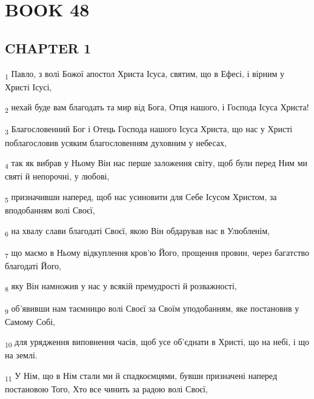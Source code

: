 \section{BOOK 48}
\subsection{CHAPTER 1}
\begin{tcolorbox}
\textsubscript{1} Павло, з волі Божої апостол Христа Ісуса, святим, що в Ефесі, і вірним у Христі Ісусі,
\end{tcolorbox}
\begin{tcolorbox}
\textsubscript{2} нехай буде вам благодать та мир від Бога, Отця нашого, і Господа Ісуса Христа!
\end{tcolorbox}
\begin{tcolorbox}
\textsubscript{3} Благословенний Бог і Отець Господа нашого Ісуса Христа, що нас у Христі поблагословив усяким благословенням духовним у небесах,
\end{tcolorbox}
\begin{tcolorbox}
\textsubscript{4} так як вибрав у Ньому Він нас перше заложення світу, щоб були перед Ним ми святі й непорочні, у любові,
\end{tcolorbox}
\begin{tcolorbox}
\textsubscript{5} призначивши наперед, щоб нас усиновити для Себе Ісусом Христом, за вподобанням волі Своєї,
\end{tcolorbox}
\begin{tcolorbox}
\textsubscript{6} на хвалу слави благодаті Своєї, якою Він обдарував нас в Улюбленім,
\end{tcolorbox}
\begin{tcolorbox}
\textsubscript{7} що маємо в Ньому відкуплення кров'ю Його, прощення провин, через багатство благодаті Його,
\end{tcolorbox}
\begin{tcolorbox}
\textsubscript{8} яку Він намножив у нас у всякій премудрості й розважності,
\end{tcolorbox}
\begin{tcolorbox}
\textsubscript{9} об'явивши нам таємницю волі Своєї за Своїм уподобанням, яке постановив у Самому Собі,
\end{tcolorbox}
\begin{tcolorbox}
\textsubscript{10} для урядження виповнення часів, щоб усе об'єднати в Христі, що на небі, і що на землі.
\end{tcolorbox}
\begin{tcolorbox}
\textsubscript{11} У Нім, що в Нім стали ми й спадкоємцями, бувши призначені наперед постановою Того, Хто все чинить за радою волі Своєї,
\end{tcolorbox}
